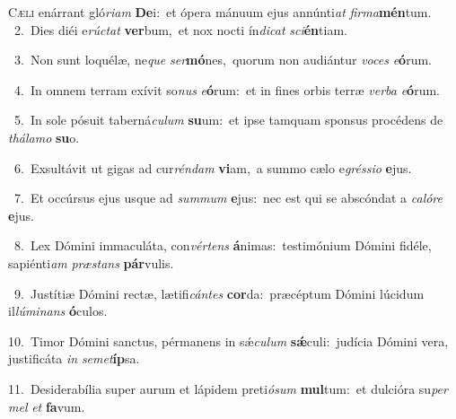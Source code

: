 \lettrine{\initial\textcolor{\initialcolor}{C}}{æli} enárrant gló\-\textit{ri}\-\textit{am} \textbf{De}\-i:~\star et ópera mánuum ejus annúnti\textit{at} \textit{fir}\-\textit{ma}\textbf{mén}tum.\\
{\numbfont\textcolor{\numbcolor}{~2.}}~Dies diéi e\-\textit{rúc}\-\textit{tat} \textbf{ver}\-bum,~\star et nox nocti ín\-\textit{di}\-\textit{cat} \textit{sci}\-\textbf{én}tiam.\par
{\numbfont\textcolor{\numbcolor}{~3.}}~Non sunt loquélæ, ne\textit{que} \textit{ser}\-\textbf{mó}nes,~\star quorum non audiántur \textit{vo}\-\textit{ces} \textit{e}\-\textbf{ó}rum.\par
{\numbfont\textcolor{\numbcolor}{~4.}}~In omnem terram exívit so\textit{nus} \textit{e}\-\textbf{ó}rum:~\star et in fines orbis terræ \textit{ver}\-\textit{ba} \textit{e}\-\textbf{ó}rum.\par
{\numbfont\textcolor{\numbcolor}{~5.}}~In sole pósuit taberná\-\textit{cu}\-\textit{lum} \textbf{su}\-um:~\star et ipse tamquam sponsus procédens de \textit{thá}\-\textit{la}\textit{mo} \textbf{su}\-o.\par
{\numbfont\textcolor{\numbcolor}{~6.}}~Exsultávit ut gigas ad cur\-\textit{rén}\-\textit{dam} \textbf{vi}\-am,~\star a summo cælo e\-\textit{grés}\-\textit{si}\textit{o} \textbf{e}\-jus.\par
{\numbfont\textcolor{\numbcolor}{~7.}}~Et occúrsus ejus usque ad \textit{sum}\-\textit{mum} \textbf{e}\-jus:~\star nec est qui se abscóndat a \textit{ca}\-\textit{ló}\textit{re} \textbf{e}\-jus.\par
{\numbfont\textcolor{\numbcolor}{~8.}}~Lex Dómini immaculáta, con\-\textit{vér}\-\textit{tens} \textbf{á}\-nimas:~\star testimónium Dómini fidéle, sapiénti\textit{am} \textit{præ}\-\textit{stans} \textbf{pár}\-vulis.\par
{\numbfont\textcolor{\numbcolor}{~9.}}~Justítiæ Dómini rectæ, lætifi\-\textit{cán}\-\textit{tes} \textbf{cor}\-da:~\star præcéptum Dómini lúcidum il\-\textit{lú}\-\textit{mi}\textit{nans} \textbf{ó}\-culos.\par
{\numbfont\textcolor{\numbcolor}{10.}}~Timor Dómini sanctus, pérmanens in sǽ\-\textit{cu}\-\textit{lum} \textbf{sǽ}\-culi:~\star judícia Dómini vera, justificáta \textit{in} \textit{se}\-\textit{met}\textbf{íp}sa.\par
{\numbfont\textcolor{\numbcolor}{11.}}~Desiderabília super aurum et lápidem preti\-\textit{ó}\-\textit{sum} \textbf{mul}\-tum:~\star et dulcióra su\textit{per} \textit{mel} \textit{et} \textbf{fa}\-vum.\par
